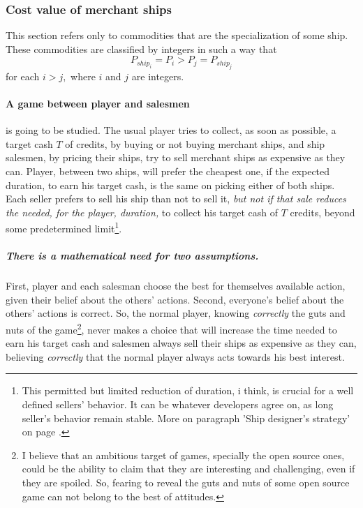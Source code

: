 \documentclass[]{article}
\begin{document}
\subsubsection{Cost value of merchant ships}
This section refers only to commodities that are the specialization of some ship. These commodities are classified by integers in such a way that \[P_{ship_{i}}=P_{i}>P_{j}=P_{ship_{j}}\] for each $i>j,$ where $i$ and $j$ are integers.
\paragraph{A game between player and salesmen} is going to be studied. The usual player tries to collect, as soon as possible, a target cash $T$ of credits, by buying or not buying merchant ships, and ship salesmen, by pricing their ships, try to sell merchant ships as expensive as they can. Player, between two ships, will prefer the cheapest one, if the expected duration, to earn his target cash, is the same on picking either of both ships. Each seller prefers to sell his ship than not to sell it, \emph{but not if that sale reduces the needed, for the player, duration,} to collect his target cash of $T$ credits, beyond some predetermined limit\footnote{This permitted but limited reduction of duration, i think, is crucial for a well defined sellers' behavior. It can be whatever developers agree on, as long seller's behavior remain stable. More on paragraph 'Ship designer's strategy' on page \pageref{designers_strategy}.}. 
\subparagraph*{There is a mathematical need for two assumptions.}
First, player and each salesman choose
the best for themselves available action, given their belief about the others’ actions. Second, everyone's belief about the others’ actions is correct. So, the normal player, knowing \emph{correctly} the guts and nuts of the game\footnote{I believe that an ambitious target of games, specially the open source ones, could be the ability to claim that they are interesting and challenging, even if they are spoiled. So, fearing to reveal the guts and nuts of some open source game can not belong to the best of attitudes.}, never makes a choice that will increase the time needed to earn his target cash and salesmen always sell their ships as expensive as they can, believing \emph{correctly} that the normal player always acts towards his best interest. 
\end{document}
